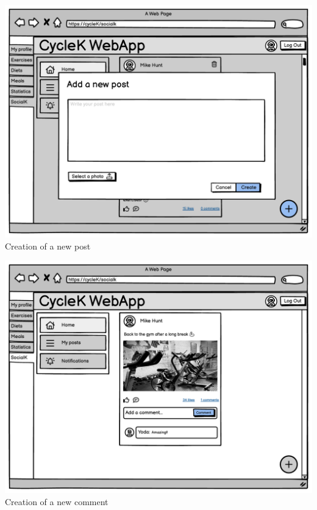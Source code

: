 \begin{center}
\includegraphics[scale=0.47]{Resources/Mockup/socialk_post.pdf}\\
Creation of a new post
\end{center}

\begin{center}
\includegraphics[scale=0.47]{Resources/Mockup/socialk_comment.pdf}\\
Creation of a new comment
\end{center}

